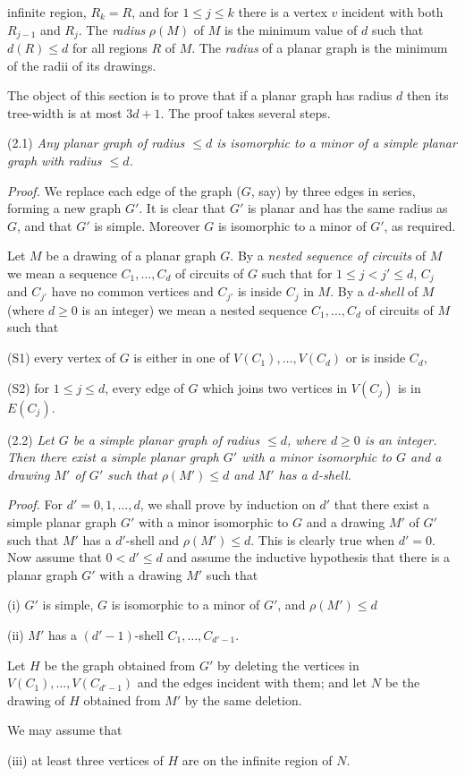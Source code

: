 \noindent infinite region, $R_k = R$, and for $1 \le j \le k$ there is a vertex $v$ incident with both $R_{j-1}$ and $R_j$. The \textit{radius} $\rho(M)$ of $M$ is the minimum value of $d$ such that $d(R) \le d$ for all regions $R$ of $M$. The \textit{radius} of a planar graph is the minimum of the radii of its drawings.

The object of this section is to prove that if a planar graph has radius $d$ then its tree-width is at most $3d + 1$. The proof takes several steps.

\stmt
(2.1) \textit{Any planar graph of radius $\le d$ is isomorphic to a minor of a simple planar graph with radius $\le d$.}

\textit{Proof.} We replace each edge of the graph ($G$, say) by three edges in series, forming a new graph $G'$. It is clear that $G'$ is planar and has the same radius as $G$, and that $G'$ is simple. Moreover $G$ is isomorphic to a minor of $G'$, as required.

Let $M$ be a drawing of a planar graph $G$. By a \textit{nested sequence of circuits} of $M$ we mean a sequence $C_1, \dots, C_d$ of circuits of $G$ such that for $1 \le j < j' \le d$, $C_j$ and $C_{j'}$ have no common vertices and $C_{j'}$ is inside $C_j$ in $M$. By a \textit{$d$-shell} of $M$ (where $d \ge 0$ is an integer) we mean a nested sequence $C_1, \dots, C_d$ of circuits of $M$ such that

\hspace*{12pt}(S1) every vertex of $G$ is either in one of $V(C_1), \dots, V(C_d)$ or is inside $C_d$,

\hspace*{12pt}(S2) for $1 \le j \le d$, every edge of $G$ which joins two vertices in $V(C_j)$ is in $E(C_j)$.

\stmt
(2.2) \textit{Let $G$ be a simple planar graph of radius $\le d$, where $d \ge 0$ is an integer. Then there exist a simple planar graph $G'$ with a minor isomorphic to $G$ and a drawing $M'$ of $G'$ such that $\rho(M') \le d$ and $M'$ has a $d$-shell.}

\textit{Proof.} For $d' = 0, 1, \dots, d$, we shall prove by induction on $d'$ that there exist a simple planar graph $G'$ with a minor isomorphic to $G$ and a drawing $M'$ of $G'$ such that $M'$ has a $d'$-shell and $\rho(M') \le d$. This is clearly true when $d' = 0$. Now assume that $0 < d' \le d$ and assume the inductive hypothesis that there is a planar graph $G'$ with a drawing $M'$ such that

\hspace*{12pt}(i) $G'$ is simple, $G$ is isomorphic to a minor of $G'$, and $\rho(M') \le d$

\hspace*{12pt}(ii) $M'$ has a $(d' - 1)$-shell $C_1, \dots, C_{d'-1}$.

Let $H$ be the graph obtained from $G'$ by deleting the vertices in $V(C_1), \dots, V(C_{d'-1})$ and the edges incident with them; and let $N$ be the drawing of $H$ obtained from $M'$ by the same deletion.

We may assume that

\hspace*{12pt}(iii) at least three vertices of $H$ are on the infinite region of $N$.
